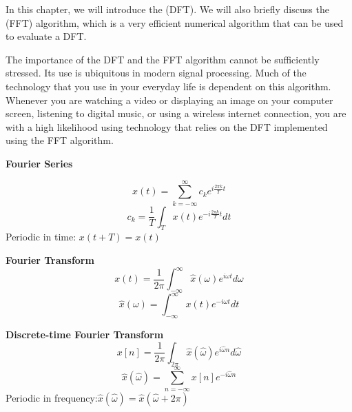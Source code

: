 In this chapter, we will introduce the \emph{} (DFT). We will also briefly
discuss the \emph{} (FFT) algorithm, which is a very efficient numerical algorithm that can be used to evaluate a DFT.

The importance of the DFT and the FFT algorithm cannot be sufficiently
stressed. Its use is ubiquitous in modern signal processing. Much of
the technology that you use in your everyday life is dependent on this
algorithm. Whenever you are watching a video or displaying an image on
your computer screen, listening to digital music, or using a wireless
internet connection, you are with a high likelihood using technology
that relies on the DFT implemented using the FFT algorithm.
\begin{marginfigure}
\hrulefill \newline

\noindent \textbf{Fourier Series}\newline

\begin{equation*}
x(t)=\sum_{k=-\infty}^{\infty} c_k e^{i \frac{2\pi k}{T} t} 
\end{equation*} 
\begin{equation*}
c_k=\frac{1}{T}\int_{T} x(t) e^{-i \frac{2\pi k}{T}  t} dt
\end{equation*}
Periodic in time: \newline $x(t+T)=x(t)$\newline

\noindent \hrulefill
\newline
\noindent \textbf{Fourier Transform}
\newline
\begin{equation*}
x(t) = \frac{1}{2\pi}\int_{-\infty}^{\infty} \hat{x}(\omega) e^{i\omega t} d\omega
\end{equation*}
\begin{equation*}
\hat{x}(\omega) = \int_{-\infty}^{\infty} x(t) e^{-i\omega t} dt 
\end{equation*}
\newline
\noindent \hrulefill
\newline

\noindent \textbf{Discrete-time Fourier Transform}
\newline 
\begin{equation*}
x[n] = \frac{1}{2\pi} \int_{2\pi} \hat{x}(\hat{\omega}) e^{i\hat{\omega} n} d\hat{\omega}
\end{equation*} 
\begin{equation*}
\hat{x}(\hat{\omega}) = \sum_{n=-\infty}^{\infty} x[n] e^{-i\hat{\omega} n} 
\end{equation*} 
Periodic in frequency:\newline $\hat{x}(\hat{\omega}) = \hat{x}(\hat{\omega}+2\pi)$
\newline
\noindent \hrulefill


\end{marginfigure}

